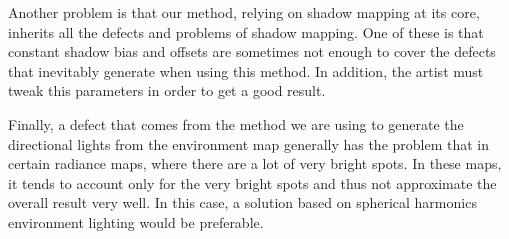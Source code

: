 Another problem is that our method, relying on shadow mapping at its core, inherits all the defects and problems of shadow mapping. One of these is that constant shadow bias and offsets are sometimes not enough to cover the defects that inevitably generate when using this method. In addition, the artist must tweak this parameters in order to get a good result.  

Finally, a defect that comes from the method we are using to generate the directional lights from the environment map generally has the problem that in certain radiance maps, where there are a lot of very bright spots. In these maps, it tends to account only for the very bright spots and thus not approximate the overall result very well. In this case, a solution based on spherical harmonics \citep{peterpikeconference} environment lighting would be preferable.
